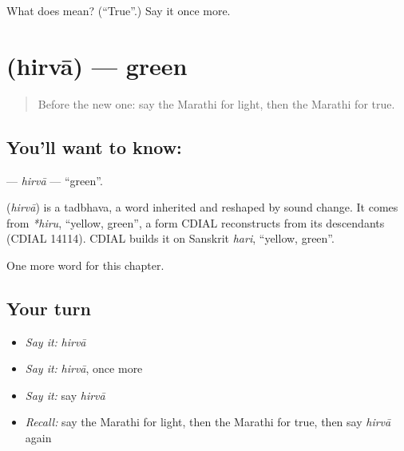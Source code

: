 \begin{tcolorbox}[breakable,colback=teal!4,colframe=teal!35!black,title={Before you move on}]
What does  mean? (\textquotedblleft{}True\textquotedblright{}.) Say it once more.
\end{tcolorbox}
\section[\texorpdfstring{\mr{हिरवा} (hirvā)}{हिरवा (hirvā)}]{ (hirvā) — green}

\label{lesson:MR-C107-hirva}



\begin{quote}
Before the new one: say the Marathi for light, then the Marathi for true.
\end{quote}

\subsection*{You'll want to know: }
\textbf{} — \emph{hirvā} — \textquotedblleft{}green\textquotedblright{}.

\begin{cousinweb}
\textbf{} (\emph{hirvā}) is a tadbhava, a word inherited and reshaped by sound change. It comes from \emph{*hiru}, \textquotedblleft{}yellow, green\textquotedblright{}, a form CDIAL reconstructs from its descendants (CDIAL 14114). CDIAL builds it on Sanskrit \emph{hari}, \textquotedblleft{}yellow, green\textquotedblright{}.
\end{cousinweb}

\begin{grammarlens}[title={What you've built}]
One more word for this chapter.
\end{grammarlens}

\subsection*{Your turn}
\begin{itemize}
\raggedright
  \item \emph{Say it:} \emph{hirvā}
  \item \emph{Say it:} \emph{hirvā}, once more
  \item \emph{Say it:} say \emph{hirvā}
  \item \emph{Recall:} say the Marathi for light, then the Marathi for true, then say \emph{hirvā} again
\end{itemize}

